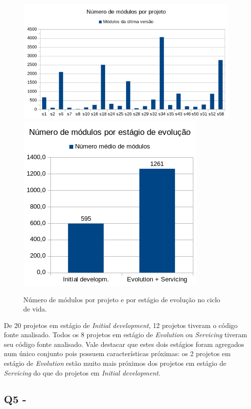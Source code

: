 \begin{figure}[h]
  \center
  \includegraphics[scale=0.6]{imagens/modules-total.png}
  \includegraphics[scale=0.6]{imagens/modules-average.png}
  \caption{Número de módulos por projeto e por estágio de evolução no ciclo de vida.}
  \label{modules-average}
\end{figure}

De 20 projetos em estágio de {\it Initial development}, 
12 projetos tiveram o código fonte analisado. 
Todos os 8 projetos em estágio de {\it Evolution} ou {\it Servicing}
tiveram seu código fonte analisado.
Vale destacar que estes dois estágios foram agregados num único conjunto 
pois possuem características próximas: 
os 2 projetos em estágio de {\it Evolution} estão
muito mais próximos dos projetos em estágio de {\it Servicing} do que 
do projetos em {\it Initial development}. 

\subsection{Q5 - \QuestaoCinco} %

